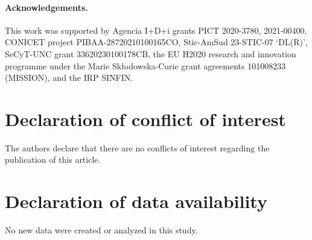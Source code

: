 \documentclass[sn-mathphys-num]{sn-jnl}%
\begin{document}
\paragraph{Acknowledgements.} 
This work was supported by Agencia I+D+i grants
 PICT 2020-3780,
 2021-00400, CONICET project PIBAA-28720210100165CO, 
 Stic-AmSud 23-STIC-07 ‘DL(R)', 
 SeCyT-UNC grant 33620230100178CB, 
 the EU
H2020 research and innovation programme under the
Marie Skłodowska-Curie grant agreements 101008233
(MISSION), and the IRP SINFIN.

\section*{Declaration of conflict of interest}
The authors declare that there are no conflicts of interest regarding the publication of this article.

\section*{Declaration of data availability}
No new data were created or analyzed in this study.

% 


% 
\end{document}
